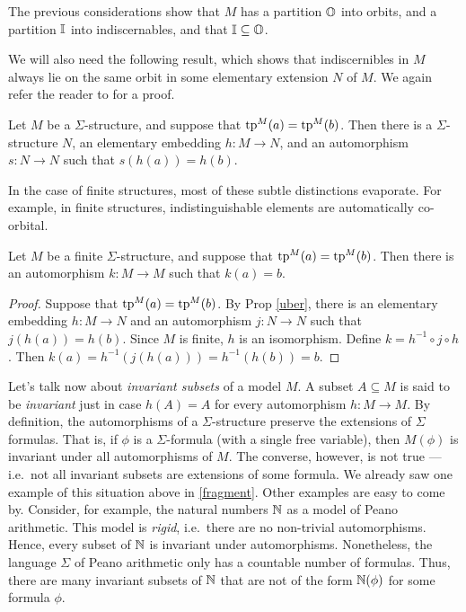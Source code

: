 The previous considerations show that $M$ has a partition $\mathbb O$ into
orbits, and a partition $\mathbb I$ into indiscernables, and that
$\mathbb I\subseteq \mathbb O$.

We will also need the following result, which shows that
indiscernibles in $M$ always lie on the same orbit in some elementary
extension $N$ of $M$.  We again refer the reader to \cite[Chap
4]{marker} for a proof.

\begin{prop} Let $M$ be a $\Sigma$-structure, and suppose that
  $\mathrm{tp}^{M}(a)=\mathrm{tp}^{M}(b)$.  Then there is a $\Sigma$-structure $N$, an
  elementary embedding $h:M\to N$, and an automorphism $s:N\to N$ such
  that $s(h(a))=h(b)$. \label{uber} \end{prop}

In the case of finite structures, most of these subtle distinctions
evaporate.  For example, in finite structures, indistinguishable
elements are automatically co-orbital.

\begin{prop} Let $M$ be a finite $\Sigma$-structure, and suppose that
  $\mathrm{tp}^{M}(a)=\mathrm{tp}^{M}(b)$.  Then there is an automorphism $k:M\to M$
  such that $k(a)=b$.  \label{orbit} \end{prop}

\begin{proof} Suppose that $\mathrm{tp}^{M}(a)=\mathrm{tp}^{M}(b)$.  By Prop \ref{uber},
  there is an elementary embedding $h:M\to N$ and an automorphism
  $j:N\to N$ such that $j(h(a))=h(b)$.  Since $M$ is finite, $h$ is an
  isomorphism.  Define $k=h^{-1}\circ j\circ h$.  Then
  $k(a)=h^{-1}(j(h(a)))=h^{-1}(h(b))=b$.  \end{proof}

Let's talk now about \emph{invariant subsets} of a model $M$.  A
subset $A\subseteq M$ is said to be \emph{invariant} just in case
$h(A)=A$ for every automorphism $h:M\to M$.  By definition, the
automorphisms of a $\Sigma$-structure preserve the extensions of
$\Sigma$ formulas.  That is, if $\phi$ is a $\Sigma$-formula (with a
single free variable), then $M(\phi )$ is invariant under all
automorphisms of $M$.  The converse, however, is not true --- i.e.\
not all invariant subsets are extensions of some formula.  We already
saw one example of this situation above in \ref{fragment}.  Other
examples are easy to come by.  Consider, for example, the natural
numbers $\mathbb N$ as a model of Peano arithmetic.  This model is
\emph{rigid}, i.e.\ there are no non-trivial automorphisms.  Hence,
every subset of $\mathbb N$ is invariant under automorphisms.  Nonetheless,
the language $\Sigma$ of Peano arithmetic only has a countable number
of formulas.  Thus, there are many invariant subsets of $\mathbb N$ that are
not of the form $\mathbb N (\phi )$ for some formula $\phi$.

